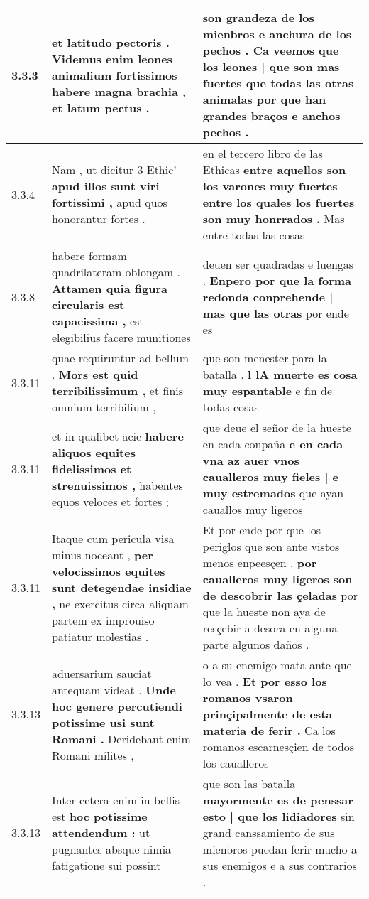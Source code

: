 \begin{tabular}{|p{1cm}|p{6.5cm}|p{6.5cm}|}
3.3.3 & et latitudo pectoris . \textbf{ Videmus enim leones animalium fortissimos habere magna brachia , } et latum pectus . & son grandeza de los mienbros e anchura de los pechos . \textbf{ Ca veemos que los leones | que son mas fuertes que todas las otras animalas } por que han grandes braços e anchos pechos . \\\hline
3.3.4 & Nam , ut dicitur 3 Ethic’ \textbf{ apud illos sunt viri fortissimi , } apud quos honorantur fortes . & en el tercero libro de las Ethicas \textbf{ entre aquellos son los varones muy fuertes entre los quales los fuertes son muy honrrados . } Mas entre todas las cosas \\\hline
3.3.8 & habere formam quadrilateram oblongam . \textbf{ Attamen quia figura circularis est capacissima , } est elegibilius facere munitiones & deuen ser quadradas e luengas . \textbf{ Enpero por que la forma redonda conprehende | mas que las otras } por ende es \\\hline
3.3.11 & quae requiruntur ad bellum . \textbf{ Mors est quid terribilissimum , } et finis omnium terribilium , & que son menester para la batalla . \textbf{ l lA muerte es cosa muy espantable } e fin de todas cosas \\\hline
3.3.11 & et in qualibet acie \textbf{ habere aliquos equites fidelissimos et strenuissimos , } habentes equos veloces et fortes ; & que deue el señor de la hueste en cada conpaña \textbf{ e en cada vna az auer vnos caualleros muy fieles | e muy estremados } que ayan cauallos muy ligeros \\\hline
3.3.11 & Itaque cum pericula visa minus noceant , \textbf{ per velocissimos equites sunt detegendae insidiae , } ne exercitus circa aliquam partem ex improuiso patiatur molestias . & Et por ende por que los periglos que son ante vistos menos enpeesçen . \textbf{ por caualleros muy ligeros son de descobrir las çeladas } por que la hueste non aya de resçebir a desora en alguna parte algunos daños . \\\hline
3.3.13 & aduersarium sauciat antequam videat . \textbf{ Unde hoc genere percutiendi potissime usi sunt Romani . } Deridebant enim Romani milites , & o a su enemigo mata ante que lo vea . \textbf{ Et por esso los romanos vsaron prinçipalmente de esta materia de ferir . } Ca los romanos escarnesçien de todos los caualleros \\\hline
3.3.13 & Inter cetera enim in bellis est \textbf{ hoc potissime attendendum : } ut pugnantes absque nimia fatigatione sui possint & que son las batalla \textbf{ mayormente es de penssar esto | que los lidiadores } sin grand canssamiento de sus mienbros puedan ferir mucho a sus enemigos e a sus contrarios . \\\hline

\end{tabular}
